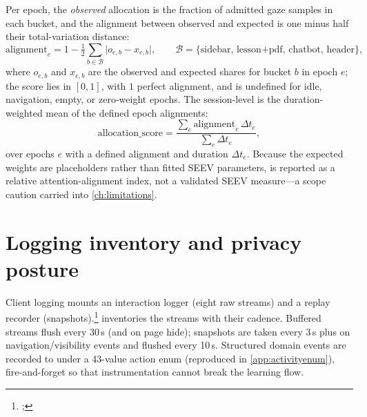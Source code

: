 Per epoch, the \emph{observed} allocation is the fraction of admitted
gaze samples in each bucket, and the alignment between observed and
expected is one minus half their total-variation distance:
\begin{equation}
  \text{alignment}_{e}
  = 1 - \tfrac{1}{2}\sum_{b \in \mathcal{B}}
    \bigl| o_{e,b} - x_{e,b} \bigr|,
  \qquad \mathcal{B} = \{\text{sidebar, lesson+pdf, chatbot, header}\},
  \label{eq:alignment}
\end{equation}
where $o_{e,b}$ and $x_{e,b}$ are the observed and expected shares for
bucket $b$ in epoch $e$; the score lies in $[0,1]$, with $1$ perfect
alignment, and is undefined for idle, navigation, empty, or zero-weight
epochs. The session-level \allocscore{} is the duration-weighted mean of
the defined epoch alignments:
\begin{equation}
  \text{allocation\_score}
  = \frac{\sum_{e} \text{alignment}_{e}\,\Delta t_{e}}
         {\sum_{e} \Delta t_{e}},
  \label{eq:allocscore}
\end{equation}
over epochs $e$ with a defined alignment and duration $\Delta t_{e}$.
Because the expected weights are placeholders rather than fitted SEEV
parameters, \allocscore{} is reported as a relative attention-alignment
index, not a validated SEEV measure---a scope caution carried into
\cref{ch:limitations}.

\section{Logging inventory and privacy posture}
\label{sec:sensing-logging}

Client logging mounts an interaction logger (eight raw streams) and a
replay recorder (snapshots).\footnote{;
}
 inventories the streams with their cadence. Buffered
streams flush every 30\,s (and on page hide); snapshots are taken every
3\,s plus on navigation/visibility events and flushed every 10\,s.
Structured domain events are recorded to  under a
43-value action enum (reproduced in \cref{app:activityenum}), fire-and-forget
so that instrumentation cannot break the learning flow.


